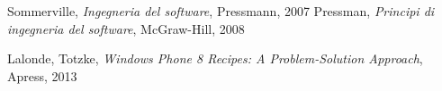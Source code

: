 
\begin{thebibliography}{9}
 Sommerville, \emph{Ingegneria del software}, Pressmann, 2007
 Pressman, \emph{Principi di ingegneria del software}, McGraw-Hill, 2008

 Lalonde, Totzke, \emph{Windows Phone 8 Recipes: A Problem-Solution Approach}, Apress, 2013


\end{thebibliography}

\clearpage{\pagestyle{empty}\cleardoublepage}
